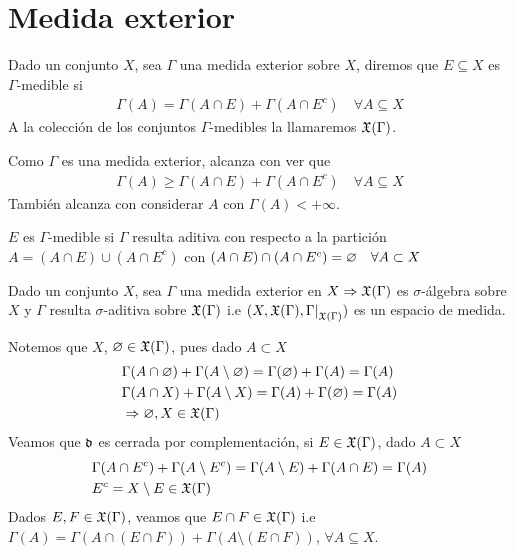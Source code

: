 \section{Medida exterior}

\begin{definition}
    Dado un conjunto \(X\), sea \(\Gamma\) una medida exterior sobre \(X\), diremos que \(E \subseteq X\) es \(\Gamma\)-medible si \begin{align*}
        \Gamma(A) = \Gamma(A \cap E) + \Gamma(A \cap E^c) \quad \forall A \subseteq X
    \end{align*}
    A la colección de los conjuntos \(\Gamma\)-medibles la llamaremos \(\mathfrak{X}(\Gamma)\).
\end{definition}

\begin{note}
    Como \(\Gamma\) es una medida exterior, alcanza con ver que \begin{align*}
        \Gamma(A) \geq \Gamma(A \cap E) + \Gamma(A \cap E^c) \quad \forall A \subseteq X
    \end{align*}
    También alcanza con considerar \(A\) con \(\Gamma(A) < +\infty\).
\end{note}

\begin{note}
    \(E\) es \(\Gamma\)-medible si \(\Gamma\) resulta aditiva con respecto a la partición \(A = (A \cap E) \cup (A \cap E^c)\) con \((A\cap E) \cap (A \cap E^c) = \varnothing \quad \forall A \subset X\)
\end{note}

\begin{theorem}[Carathéodory]
    Dado un conjunto \(X\), sea \(\Gamma\) una medida exterior en \(X \Rightarrow \mathfrak{X}(\Gamma)\) es \(\sigma\)-álgebra sobre \(X\) y \(\Gamma\) resulta
    \(\sigma\)-aditiva sobre \(\mathfrak{X}(\Gamma)\) i.e \((X, \mf{X}(\Gamma), \restr{\Gamma}{\mf{X}(\Gamma)})\) es un espacio de medida.
\end{theorem}

Notemos que \(X\), \(\varnothing \in \mathfrak{X}(\Gamma)\), pues dado \(A \subset X\) \begin{align*}
     & \Gamma(A \cap \varnothing) + \Gamma(A \setminus \varnothing) = \Gamma(\varnothing) + \Gamma(A) = \Gamma(A) \\
     & \Gamma(A \cap X) + \Gamma(A \setminus X) = \Gamma(A) + \Gamma(\varnothing) = \Gamma(A)   \\
     & \Rightarrow \varnothing, X \in \mathfrak{X}(\Gamma)
\end{align*}
Veamos que \(\mathfrak{\Gamma}\) es cerrada por complementación, si \(E \in \mathfrak{X}(\Gamma)\), dado \(A \subset X\) \begin{align*}
     & \Gamma(A \cap E^c) + \Gamma(A \setminus E^c) = \Gamma(A \setminus E) + \Gamma(A \cap E) = \Gamma(A) \\
     & E^c = X \setminus E \in \mathfrak{X}(\Gamma)
\end{align*}
Dados \(E, F \in \mathfrak{X}(\Gamma)\), veamos que \(E \cap F \in \mathfrak{X}(\Gamma)\) i.e \(\Gamma(A) = \Gamma(A \cap (E \cap F)) + \Gamma(A \setminus (E \cap F)) \text{, } \forall A \subseteq X\).


